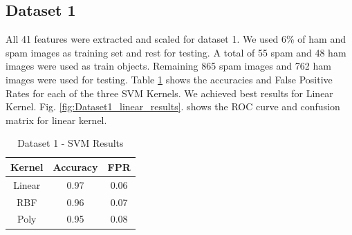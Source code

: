 \subsection{Dataset 1}
\par All 41 features were extracted and scaled for dataset 1. We used 6\% of ham and spam images as training set and rest for testing. A total of 55 spam and 48 ham images were used as train objects. Remaining 865 spam images and 762 ham images were used for testing. Table \ref{table:dataset1_svm_results} shows the accuracies and False Positive Rates for each of the three SVM Kernels. We achieved best results for Linear Kernel. Fig. \ref{fig:Dataset1_linear_results}. shows the ROC curve and confusion matrix for linear kernel.

\begin{table}[htb]
	\centering
		\caption{Dataset 1 - SVM Results}
		\begin{tabular}{ |c|c|c| } 
			\hline
			Kernel & Accuracy & FPR \\
			\hline
			Linear & 0.97 & 0.06 \\ 
			\hline
			RBF & 0.96 & 0.07 \\ 
			\hline
			Poly & 0.95 & 0.08 \\ 
			\hline
		\end{tabular}
	\label{table:dataset1_svm_results}
\end{table}




